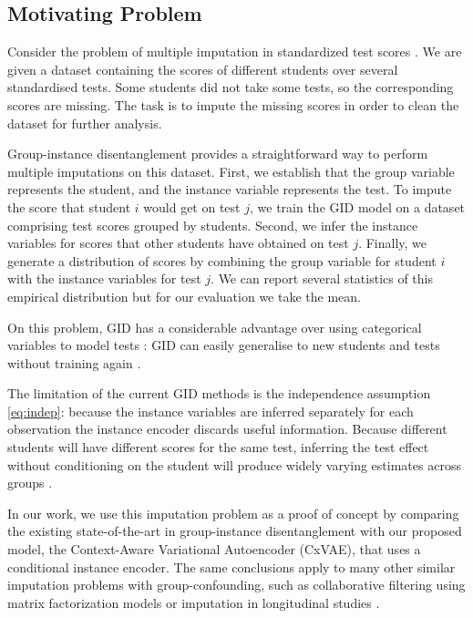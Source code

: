 \documentclass[nohyperref]{article}
\theoremstyle{plain}
\theoremstyle{definition}
\theoremstyle{remark}
\begin{document}
\subsection{Motivating Problem} 

Consider the problem of multiple imputation in standardized test scores \citep{Gelman2006Data}. We are given a dataset containing the scores of different students over several standardised tests. Some students did not take some tests, so the corresponding scores are missing. The task is to impute the missing scores in order to clean the dataset for further analysis.

Group-instance disentanglement provides a straightforward way to perform multiple imputations on this dataset. First, we establish that the group variable represents the student, and the instance variable represents the test. To impute the score that student $i$ would get on test $j$, we train the GID model on a dataset comprising test scores grouped by students. Second, we infer the instance variables for scores that other students have obtained on test $j$. Finally, we generate a distribution of scores by combining the group variable for student $i$ with the instance variables for test $j$. We can report several statistics of this empirical distribution \citep{Rubin1996MultipleIA} but for our evaluation we take the mean.

On this problem, GID has a considerable advantage over using categorical variables to model tests \citep{Pinheiro2001MixedEffectsMI, Gelman2006Data}: GID can easily generalise to new students and tests without training again \citep{Tenenbaum2000SeparatingSA}. 

The limitation of the current GID methods is the independence assumption \cref{eq:indep}: because the instance variables are inferred separately for each observation the instance encoder discards useful information. Because different students will have different scores for the same test, inferring the test effect without conditioning on the student will produce widely varying estimates across groups \citep{Pinheiro2001MixedEffectsMI}.

In our work, we use this imputation problem as a proof of concept by comparing the existing state-of-the-art in group-instance disentanglement \citep{Bouchacourt2018MultiLevelVA, Hosoya2019GroupbasedLO, Nmeth2020AdversarialDW} with our proposed model, the Context-Aware Variational Autoencoder (CxVAE), that uses a conditional instance encoder. The same conclusions apply to many other similar imputation problems with group-confounding, such as collaborative filtering using matrix factorization models \citep{Koren2009MatrixFT} or imputation in longitudinal studies \citep{Spratt2010StrategiesFM}.
\end{document}

